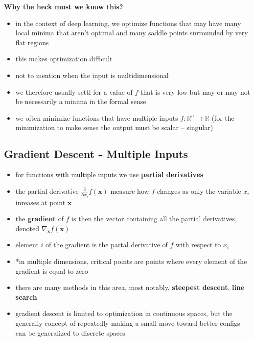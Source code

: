 \documentclass[11pt, twocolumn]{report}
\def\realnumbers{\mathbb{R}}
\begin{document}
\textbf{Why the heck must we know this?}
\begin{itemize}
  \item in the context of deep learning, we optimize functions that may have
    many local minima that aren't optimal and many saddle points surrounded by
    very flat regions
  \item this makes optimization difficult
  \item not to mention when the input is multidimensional
  \item we therefore usually settl for a value of $f$ that is very low but may
    or may not be necessarily a minima in the formal sense
  \item we often minimize functions that have multiple inputs $f :
    \realnumbers^n \to \realnumbers$ (for the minimization to make sense the
    output must be scalar -- singular)
\end{itemize}

\subsection{Gradient Descent - Multiple Inputs}
\begin{itemize}
  \item for functions with multiple inputs we use \textbf{partial derivatives}
  \item the partial derivative $\frac{\partial}{\partial x_i} f(\bm{x})$
    measure how $f$ changes as only the variable $x_i$ inreases at point
    $\bm{x}$
  \item the \textbf{gradient} of $f$ is then the vector containing all the
    partial derivatives, denoted $\nabla_{\bm{x}} f(\bm{x})$
  \item element $i$ of the gradient is the partal derivative of $f$ with
    respect to $x_i$
  \item *in multiple dimensions, critical points are points where every element
    of the gradient is equal to zero
  \item there are many methods in this area, most notably, \textbf{steepest
      descent}, \textbf{line search}
  \item gradient descent is limited to optimization in continuous
    spaces, but the generally concept of repeatedly making a small move toward
    better configs can be generalized to discrete spaces
\end{itemize}
\end{document}
